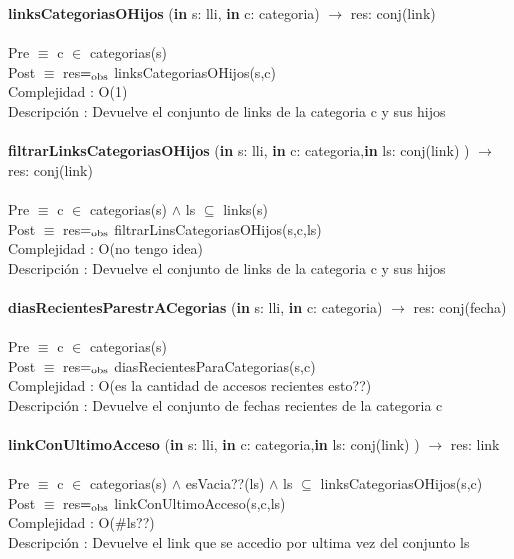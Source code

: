 \documentclass[10pt, a4paper]{article}
\begin{document}
	
	\textbf{linksCategoriasOHijos} (\textbf{in} s: lli, \textbf{in} c: categoria) $\longrightarrow$ res: conj(link)\\\\
	Pre $\equiv$ {c $\in$ categorias(s)}\\
	Post $\equiv$ {res$=_{\mathrm{obs}}$ linksCategoriasOHijos(s,c)}\\
	Complejidad : O(1)\\
	Descripci\'{o}n : Devuelve el conjunto de links de la categoria c y sus hijos\\\\
	
	
	\textbf{filtrarLinksCategoriasOHijos} (\textbf{in} s: lli, \textbf{in} c: categoria,\textbf{in} ls: conj(link) ) $\longrightarrow$ res: conj(link)\\\\
	Pre $\equiv$ {c $\in$ categorias(s) $\wedge$ ls $\subseteq$ links(s)}\\
	Post $\equiv$ {res$=_{\mathrm{obs}}$ filtrarLinsCategoriasOHijos(s,c,ls)}\\
	Complejidad : O(no tengo idea)\\
	Descripci\'{o}n : Devuelve el conjunto de links de la categoria c y sus hijos\\\\

	\textbf{diasRecientesParestrACegorias} (\textbf{in} s: lli, \textbf{in} c: categoria) $\longrightarrow$ res: conj(fecha)\\\\
	Pre $\equiv$ {c $\in$ categorias(s)}\\
	Post $\equiv$ {res$=_{\mathrm{obs}}$ diasRecientesParaCategorias(s,c)}\\
	Complejidad : O(es la cantidad de accesos recientes esto??)\\
	Descripci\'{o}n : Devuelve el conjunto de fechas recientes de la categoria c\\\\
	
	\textbf{linkConUltimoAcceso} (\textbf{in} s: lli, \textbf{in} c: categoria,\textbf{in} ls: conj(link) ) $\longrightarrow$ res: link\\\\
	Pre $\equiv$ {c $\in$ categorias(s) $\wedge$ esVacia??(ls) $\wedge$ ls $\subseteq$ linksCategoriasOHijos(s,c)}\\
	Post $\equiv$ {res$=_{\mathrm{obs}}$ linkConUltimoAcceso(s,c,ls)}\\
	Complejidad : O($\#$ls??)\\
	Descripci\'{o}n : Devuelve el link que se accedio por ultima vez del conjunto ls\\\\
	
\end{document}
